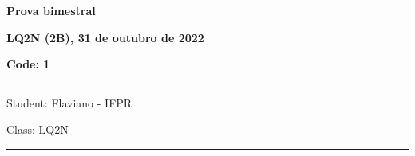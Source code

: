 \documentclass[12pt, addpoints]{exam}
\begin{document}
    \begin{minipage}[b]{0.75\linewidth}
        \begin{flushleft}
            {\bf \large Prova bimestral}
        \end{flushleft}
        \begin{flushleft}
            {\bf \large LQ2N (2B), 31 de outubro de 2022}
        \end{flushleft}
    \end{minipage}
    \begin{minipage}[b]{0.20\linewidth}
        \begin{flushright}
            {\bf \large Code: 1}
        \end{flushright}
    \end{minipage}
    \vspace{0.5cm} \hrule \vspace{0.5cm}
    \begin{minipage}{0.75\linewidth}
        \begin{flushleft}
            Student: Flaviano - IFPR
        \end{flushleft}
    \end{minipage}
    \begin{minipage}{0.20\linewidth}
        \begin{flushright}
            Class: LQ2N
        \end{flushright}
    \end{minipage}
    \vspace{0.5cm} \hrule \vspace{0.5cm}
\end{document}
